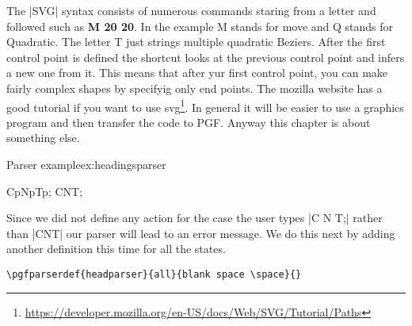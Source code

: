 The |SVG| syntax consists of numerous commands staring from a letter and followed such as \textbf{M 20 20}. In the
example M stands for move and Q stands for Quadratic. The letter T just strings multiple quadratic Beziers. After the first control point is defined the shortcut looks at the previous control point and infers a new one from it. This means that after yur first control point, you can make fairly complex shapes by specifyig only end points. The mozilla website has a good tutorial if you want to use svg\footnote{\protect\url{https://developer.mozilla.org/en-US/docs/Web/SVG/Tutorial/Paths}}. In general it will be easier to use a graphics program and then transfer the code to PGF. Anyway this chapter is about something else.

\begin{texexample}{Parser example}{ex:headingsparser}
\bgroup
{}
{}
{} 
{} 
{\breakline} 
{}

\def\boxanelement#1{\fbox{\LARGE#1 }}%
\def\breakline{\par\nointerlineskip}%
CpNpTp;
\medskip
{}CNT;
\egroup
\end{texexample}

Since we did not define any action for the case the user types |C N T;| rather than |CNT| our parser will lead to an error message. We do this next by adding another definition this time for all the states.

\begin{verbatim}
\pgfparserdef{headparser}{all}{blank space \space}{}
\end{verbatim}

